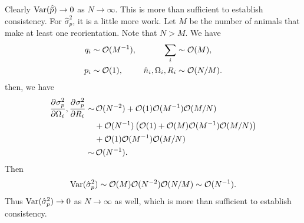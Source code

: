 \documentclass[12pt]{article}
\begin{document}
Clearly $\operatorname{Var}(\hat{\bar{p}})\to0$ as $N\to\infty$. This is more than sufficient to establish consistency. For $\hat{\sigma}_p^2$, it is a little more work. Let $M$ be the number of animals that make at least one reorientation. Note that $N>M$. We have
%
\begin{equation}\label{eq:orderNM}
  \begin{aligned}
    q_i &\sim \mathcal{O}(M^{-1}), 
    & \sum_i &\sim \mathcal{O}(M), \\
    p_i &\sim \mathcal{O}(1), 
    & \hat{n}_i,\Omega_i,R_i &\sim \mathcal{O}(N/M).
  \end{aligned}
\end{equation}
%
then, we have
%
\begin{equation}\label{eq:coefforder}
  \begin{aligned}
    \pdiff{\sigma_p^2}{\Omega_i},\pdiff{\sigma_p^2}{R_i}  \sim&\, 
    \CO(N^{-2}) + \CO(1)\CO(M^{-1})\CO(M/N) \\&+ \CO(N^{-1})\prn{\CO(1) + \CO(M)\CO(M^{-1})\CO(M/N)} \\&+ \CO(1)\CO(M^{-1})\CO(M/N)\\
      \sim&\, \CO(N^{-1}).
  \end{aligned}
\end{equation}
%
Then
%
\begin{equation}\label{eq:ordervarvarp}
  \operatorname{Var}(\hat{\sigma}_p^2) \sim \mathcal{O}(M)\mathcal{O}(N^{-2})\mathcal{O}(N/M) \sim \mathcal{O}(N^{-1}).
\end{equation}
%
Thus $\operatorname{Var}(\hat{\sigma}_p^2)\to0$ as $N\to\infty$ as well, which is more than sufficient to establish consistency.












\end{document}
